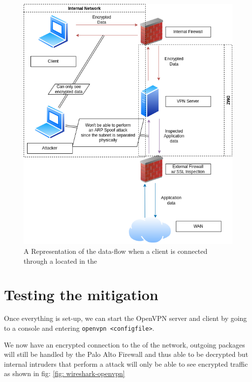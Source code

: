 \begin{figure}[h!]
 \centering
 \includegraphics[width=13.5cm]{img/VPN_inner_working.png}
 \caption{A Representation of the data-flow when a client is connected through a  located in the }
 \label{fig: Inner Workings}
\end{figure}


\newpage

\section{Testing the mitigation}

Once everything is set-up, we can start the OpenVPN server and client by going to a console and entering \verb|openvpn <configfile>|.

We now have an encrypted connection to the  of the network, outgoing packages will still be handled by the Palo Alto Firewall and thus able to be  decrypted but internal intruders that perform a  attack will only be able to see encrypted traffic as shown in fig: \ref{fig: wireshark-openvpn}

